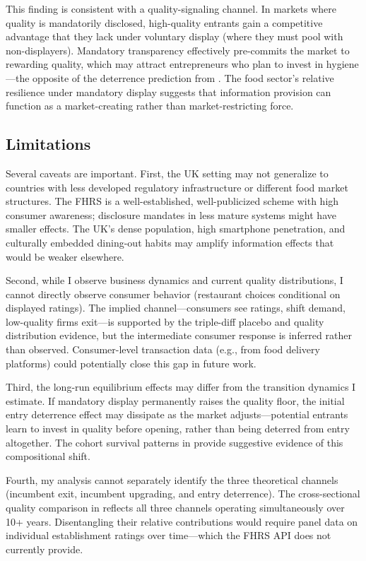 \documentclass[12pt]{article}
\begin{document}
This finding is consistent with a quality-signaling channel. In markets where quality is mandatorily disclosed, high-quality entrants gain a competitive advantage that they lack under voluntary display (where they must pool with non-displayers). Mandatory transparency effectively pre-commits the market to rewarding quality, which may attract entrepreneurs who plan to invest in hygiene---the opposite of the deterrence prediction from \citet{milgrom1981good}. The food sector's relative resilience under mandatory display suggests that information provision can function as a market-creating rather than market-restricting force.

\subsection{Limitations}

Several caveats are important. First, the UK setting may not generalize to countries with less developed regulatory infrastructure or different food market structures. The FHRS is a well-established, well-publicized scheme with high consumer awareness; disclosure mandates in less mature systems might have smaller effects. The UK's dense population, high smartphone penetration, and culturally embedded dining-out habits may amplify information effects that would be weaker elsewhere.

Second, while I observe business dynamics and current quality distributions, I cannot directly observe consumer behavior (restaurant choices conditional on displayed ratings). The implied channel---consumers see ratings, shift demand, low-quality firms exit---is supported by the triple-diff placebo and quality distribution evidence, but the intermediate consumer response is inferred rather than observed. Consumer-level transaction data (e.g., from food delivery platforms) could potentially close this gap in future work.

Third, the long-run equilibrium effects may differ from the transition dynamics I estimate. If mandatory display permanently raises the quality floor, the initial entry deterrence effect may dissipate as the market adjusts---potential entrants learn to invest in quality before opening, rather than being deterred from entry altogether. The cohort survival patterns in  provide suggestive evidence of this compositional shift.

Fourth, my analysis cannot separately identify the three theoretical channels (incumbent exit, incumbent upgrading, and entry deterrence). The cross-sectional quality comparison in  reflects all three channels operating simultaneously over 10+ years. Disentangling their relative contributions would require panel data on individual establishment ratings over time---which the FHRS API does not currently provide.
\end{document}
